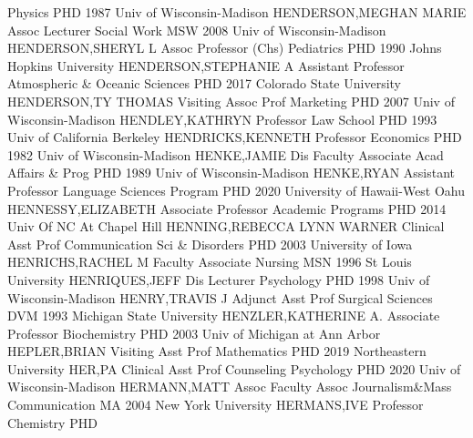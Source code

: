 \documentclass[
]{article}
\begin{document}
Physics \textbar PHD 1987 Univ of Wisconsin-Madison \textbar{}
 \textbar HENDERSON,MEGHAN MARIE \textbar Assoc Lecturer
\textbar Social Work \textbar MSW 2008 Univ of Wisconsin-Madison
\textbar{}  \textbar HENDERSON,SHERYL L \textbar Assoc
Professor (Chs) \textbar Pediatrics \textbar PHD 1990 Johns Hopkins
University \textbar{}  \textbar HENDERSON,STEPHANIE A
\textbar Assistant Professor \textbar Atmospheric \& Oceanic Sciences
\textbar PHD 2017 Colorado State University \textbar{} 
\textbar HENDERSON,TY THOMAS \textbar Visiting Assoc Prof
\textbar Marketing \textbar PHD 2007 Univ of Wisconsin-Madison
\textbar{}  \textbar HENDLEY,KATHRYN \textbar Professor
\textbar Law School \textbar PHD 1993 Univ of California Berkeley
\textbar{}  \textbar HENDRICKS,KENNETH \textbar Professor
\textbar Economics \textbar PHD 1982 Univ of Wisconsin-Madison
\textbar{}  \textbar HENKE,JAMIE \textbar Dis Faculty
Associate \textbar Acad Affairs \& Prog \textbar PHD 1989 Univ of
Wisconsin-Madison \textbar{}  \textbar HENKE,RYAN
\textbar Assistant Professor \textbar Language Sciences Program
\textbar PHD 2020 University of Hawaii-West Oahu \textbar{} 
\textbar HENNESSY,ELIZABETH \textbar Associate Professor
\textbar Academic Programs \textbar PHD 2014 Univ Of NC At Chapel Hill
\textbar{}  \textbar HENNING,REBECCA LYNN WARNER
\textbar Clinical Asst Prof \textbar Communication Sci \& Disorders
\textbar PHD 2003 University of Iowa \textbar{} 
\textbar HENRICHS,RACHEL M \textbar Faculty Associate \textbar Nursing
\textbar MSN 1996 St Louis University \textbar{} 
\textbar HENRIQUES,JEFF \textbar Dis Lecturer \textbar Psychology
\textbar PHD 1998 Univ of Wisconsin-Madison \textbar{} 
\textbar HENRY,TRAVIS J \textbar Adjunct Asst Prof \textbar Surgical
Sciences \textbar DVM 1993 Michigan State University \textbar{}
 \textbar HENZLER,KATHERINE A. \textbar Associate Professor
\textbar Biochemistry \textbar PHD 2003 Univ of Michigan at Ann Arbor
\textbar{}  \textbar HEPLER,BRIAN \textbar Visiting Asst
Prof \textbar Mathematics \textbar PHD 2019 Northeastern University
\textbar{}  \textbar HER,PA \textbar Clinical Asst Prof
\textbar Counseling Psychology \textbar PHD 2020 Univ of
Wisconsin-Madison \textbar{}  \textbar HERMANN,MATT
\textbar Assoc Faculty Assoc \textbar Journalism\&Mass Communication
\textbar MA 2004 New York University \textbar{} 
\textbar HERMANS,IVE \textbar Professor \textbar Chemistry \textbar PHD
\end{document}
